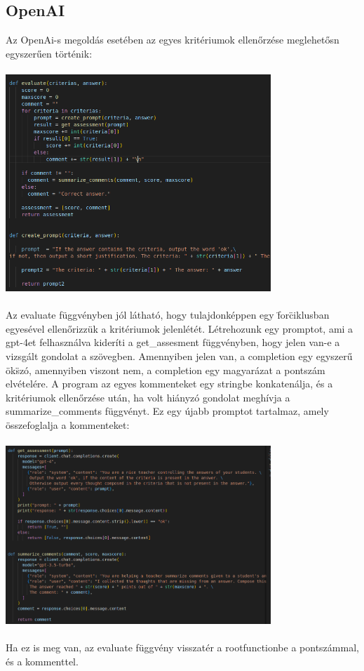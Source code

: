 \documentclass{article}
\begin{document}
\subsection{OpenAI}

Az OpenAi-s megoldás esetében az egyes kritériumok ellenőrzése meglehetősn egyszerűen történik:
\\
\\
\includegraphics[width=10cm]{openai1.png}
\\
\\
\indent Az evaluate függvényben jól látható, hogy tulajdonképpen egy \"for\" ciklusban egyesével ellenőrizzük a kritériumok jelenlétét.
Létrehozunk egy promptot, ami a gpt-4et felhasználva kideríti a get\_assesment függvényben, hogy jelen van-e a vizsgált gondolat a szövegben.
Amennyiben jelen van, a completion egy egyszerű \"ok\" szó, amennyiben viszont nem, a completion egy magyarázat a pontszám elvételére.
A program az egyes kommenteket egy stringbe konkatenálja, és a kritériumok ellenőrzése után, ha volt hiányzó gondolat meghívja a summarize\_comments
függvényt. Ez egy újabb promptot tartalmaz, amely összefoglalja a kommenteket:
\\
\\
\includegraphics[width=10cm]{sum.png}
\\
\\
\indent Ha ez is meg van, az evaluate függvény visszatér a rootfunctionbe a pontszámmal, és a kommenttel. 
\end{document}
